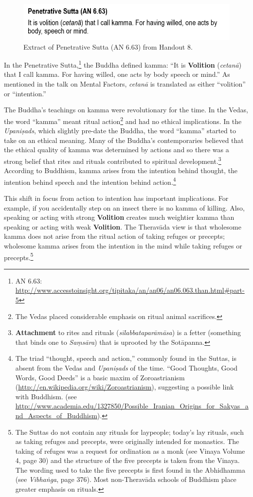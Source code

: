 \begin{figure}[h]
\centering
\includegraphics[width=0.7\linewidth]{./Diagrams/AN6}
\caption{Extract of Penetrative Sutta (AN 6.63) from Handout 8.}
\label{fig:AN6}
\end{figure}

In the Penetrative Sutta,\footnote{AN 6.63: \url{http://www.accesstoinsight.org/tipitaka/an/an06/an06.063.than.html\#part-5}} the Buddha defined kamma: “It is \textbf{Volition} (\textit{cetanā}) that I call kamma. For having willed, one acts by body speech or mind.” As mentioned in the talk on Mental Factors, \textit{cetanā} is translated as either “volition” or “intention.”

The Buddha’s teachings on kamma were revolutionary for the time. In the Vedas, the word “kamma” meant ritual action\footnote{The Vedas placed considerable emphasis on ritual animal sacrifices.} and had no ethical implications. In the \textit{Upaniṣads}, which slightly pre-date the Buddha, the word “kamma” started to take on an ethical meaning. Many of the Buddha’s contemporaries believed that the ethical quality of kamma was determined by actions and so there was a strong belief that rites and rituals contributed to spiritual development.\footnote{\textbf{Attachment} to rites and rituals (\textit{sīlabbataparāmāsa}) is a fetter (something that binds one to \textit{Saṃsāra}) that is uprooted by the Sotāpanna.} According to Buddhism, kamma arises from the intention behind thought, the intention behind speech and the intention behind action.\footnote{The triad “thought, speech and action,” commonly found in the Suttas, is absent from the Vedas and \textit{Upaniṣads} of the time. “Good Thoughts, Good Words, Good Deeds” is a basic maxim of Zoroastrianism (\url{http://en.wikipedia.org/wiki/Zoroastrianism}), suggesting a possible link with Buddhism. (see\\
\url{http://www.academia.edu/1327850/Possible_Iranian_Origins_for_Sakyas_and_Aspects_of_Buddhism}).}

This shift in focus from action to intention has important implications. For example, if you accidentally step on an insect there is no kamma of killing. Also, speaking or acting with strong \textbf{Volition} creates much weightier kamma than speaking or acting with weak \textbf{Volition}. The Theravāda view is that wholesome kamma does not arise from the ritual action of taking refuges or precepts; wholesome kamma arises from the intention in the mind while taking refuges or precepts.\footnote{The Suttas do not contain any rituals for laypeople; today’s lay rituals, such as taking refuges and precepts, were originally intended for monastics. The taking of refuges was a request for ordination as a monk (see Vinaya Volume 4, page 30) and the structure of the five precepts is taken from the Vinaya. The wording used to take the five precepts is first found in the Abhidhamma (see \textit{Vibhaṅga}, page 376). Most non-Theravāda schools of Buddhism place greater emphasis on rituals.}

